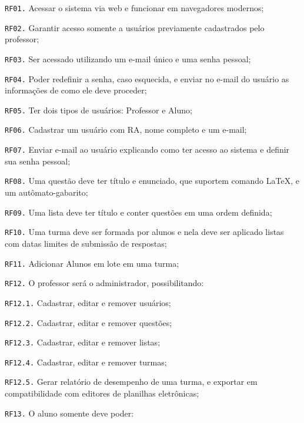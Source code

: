 \documentclass[
	12pt,				%
	openany,
	oneside,
	a4paper,			%
	english,			%
	brazil				%
	]{abntex2}
\begin{document}
\begin{alineas}%
  \item[\texttt{RF01.}] Acessar o sistema via web e funcionar em navegadores modernos;
  \item[\texttt{RF02.}] Garantir acesso somente a usuários previamente cadastrados pelo professor;
  \item[\texttt{RF03.}] Ser acessado utilizando um e-mail único e uma senha pessoal;
  \item[\texttt{RF04.}] Poder redefinir a senha, caso esquecida, e enviar no e-mail do usuário as informações de como ele deve proceder;
  \item[\texttt{RF05.}] Ter dois tipos de usuários: Professor e Aluno;
  \item[\texttt{RF06.}] Cadastrar um usuário com RA, nome completo e um e-mail;
  \item[\texttt{RF07.}] Enviar e-mail ao usuário explicando como ter acesso ao sistema e definir sua senha pessoal;
  \item[\texttt{RF08.}] Uma questão deve ter título e enunciado, que suportem comando \LaTeX, e um autômato-gabarito;
  \item[\texttt{RF09.}] Uma lista deve ter título e conter questões em uma ordem definida;
  \item[\texttt{RF10.}] Uma turma deve ser formada por alunos e nela deve ser aplicado listas com datas limites de submissão de respostas;
  \item[\texttt{RF11.}] Adicionar Alunos em lote em uma turma;
  \item[\texttt{RF12.}] O professor será o administrador, possibilitando:
  \begin{alineas}
    \item[\texttt{RF12.1.}] Cadastrar, editar e remover usuários;
    \item[\texttt{RF12.2.}] Cadastrar, editar e remover questões;
    \item[\texttt{RF12.3.}] Cadastrar, editar e remover listas;
    \item[\texttt{RF12.4.}] Cadastrar, editar e remover turmas;
    \item[\texttt{RF12.5.}] Gerar relatório de desempenho de uma turma, e exportar em compatibilidade com editores de planilhas eletrônicas;
  \end{alineas}
  \item[\texttt{RF13.}] O aluno somente deve poder:
  \begin{alineas}

\end{alineas}
\end{alineas}
\end{document}
